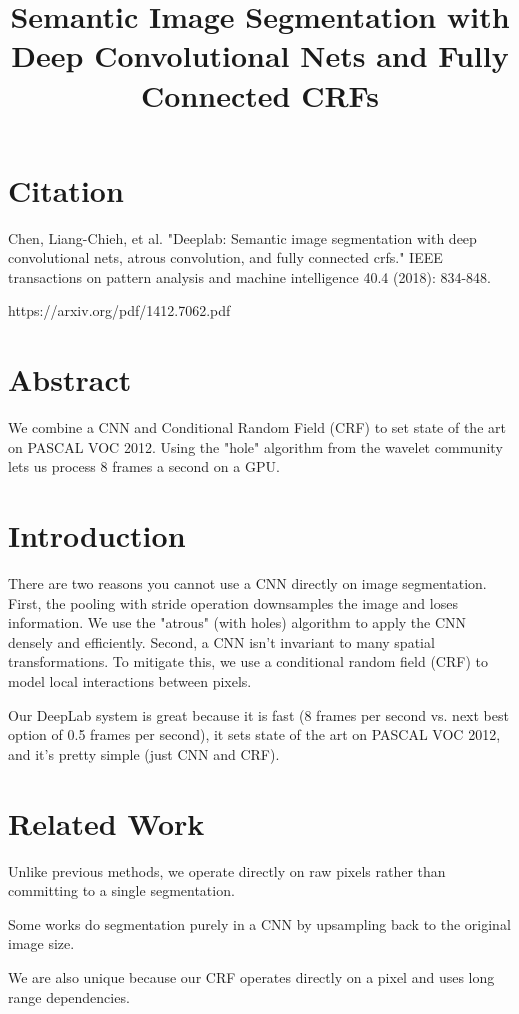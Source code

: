 \documentclass[a4paper]{article}
\title{Semantic Image Segmentation with Deep Convolutional Nets and Fully
Connected CRFs}
\date{}
\begin{document}
\maketitle

\section{Citation}

Chen, Liang-Chieh, et al. "Deeplab: Semantic image segmentation with deep convolutional nets, atrous convolution, and fully connected crfs." IEEE transactions on pattern analysis and machine intelligence 40.4 (2018): 834-848.

https://arxiv.org/pdf/1412.7062.pdf

\section{Abstract}
We combine a CNN and Conditional Random Field (CRF) to set state of the art on
PASCAL VOC 2012. Using the "hole" algorithm from the wavelet community lets us
process 8 frames a second on a GPU.

\section{Introduction}
There are two reasons you cannot use a CNN directly on image segmentation.
First, the pooling with stride operation downsamples the image and loses
information. We use the "atrous" (with holes) algorithm to apply the CNN
densely and efficiently.  Second, a CNN isn't invariant to many spatial
transformations. To mitigate this, we use a conditional random field (CRF) to
model local interactions between pixels.

Our DeepLab system is great because it is fast (8 frames per second vs. next
best option of 0.5 frames per second), it sets state of the art on PASCAL VOC
2012, and it's pretty simple (just CNN and CRF).

\section{Related Work}
Unlike previous methods, we operate directly on raw pixels rather than
committing to a single segmentation.

Some works do segmentation purely in a CNN by upsampling back to the original
image size.

We are also unique because our CRF operates directly on a pixel and uses
long range dependencies.
\end{document}
